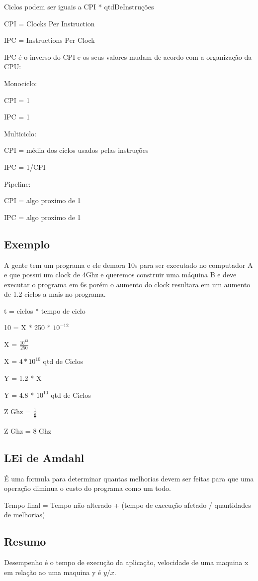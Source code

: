 \documentclass[a4paper]{article}
\begin{document}
Ciclos podem ser iguais a CPI * qtdDeInstruções

CPI = Clocks Per Instruction

IPC = Instructions Per Clock

IPC é o inverso do CPI e os seus valores mudam de acordo com a organização da CPU:

Monociclo:

    CPI = 1

    IPC = 1

Multiciclo:

    CPI = média dos ciclos usados pelas instruções

    IPC = 1/CPI


Pipeline:

    CPI = algo proximo de 1

    IPC = algo proximo de 1

\subsection{Exemplo}
A gente tem um programa e ele demora 10s para ser executado no computador A e que possui um clock de 4Ghz e queremos
construir uma máquina B e deve executar o programa em 6s porém o aumento do clock resultara em um aumento de 1.2 ciclos
a mais no programa.

t = ciclos * tempo de ciclo

10 = X * 250 * $10^{-12}$

X = $\frac{10^{13}}{250}$

X = $4 * 10^{10}$ qtd de Ciclos

Y = 1.2 * X

Y = 4.8 * $10^{10}$ qtd de Ciclos

Z Ghz = $\frac{1}{\frac{6}{Y}}$

Z Ghz = 8 Ghz

\subsection{LEi de Amdahl}
É uma formula para determinar quantas melhorias devem ser feitas para que uma operação diminua o custo do programa como
um todo.

Tempo final = Tempo não alterado + (tempo de execução afetado / quantidades de melhorias)

\subsection{Resumo}
Desempenho é o tempo de execução da aplicação, velocidade de uma maquina x em relação ao uma maquina y é $y/x$.
\end{document}
